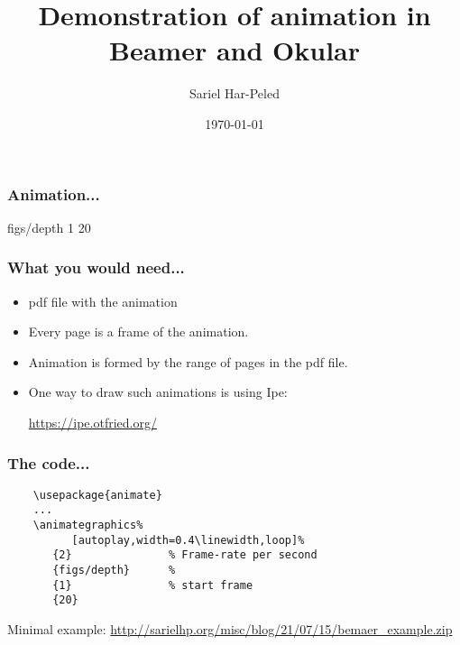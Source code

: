 \documentclass[compress,12pt,aspectratio=169,table]{beamer}
\title{Demonstration of animation in Beamer and Okular}
\author{%
   Sariel Har-Peled%
}%
\date{\today}
\institute[UIUC]{%
   \inst{1}%
   University of Illinois at Urbana-Champaign%
}
\begin{document}
\frame{\titlepage}

\begin{frame}
    \frametitle{Animation...}%
    \centerline{%
       {figs/depth} %
       {1}          %
       {20}         %
    }
\end{frame}

\begin{frame}
    \frametitle{What you would need...}

    \begin{itemize}
        \item pdf file with the animation

        \item Every page is a frame of the animation.

        \item Animation is formed by the range of pages in the pdf file.

        \item One way to draw such animations is using Ipe:

        \url{https://ipe.otfried.org/}
    \end{itemize}
\end{frame}


\begin{frame}[fragile]\frametitle{The code...}
\begin{verbatim}
    \usepackage{animate}
    ...
    \animategraphics%
          [autoplay,width=0.4\linewidth,loop]%
       {2}               % Frame-rate per second
       {figs/depth}      %
       {1}               % start frame
       {20}  
\end{verbatim}

    Minimal example:
    \url{http://sarielhp.org/misc/blog/21/07/15/bemaer_example.zip}

\end{frame}
\end{document}
